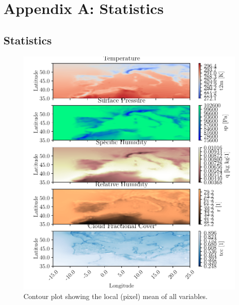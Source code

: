 \appendix
\chapter{Appendix A: Statistics}
\section{Statistics}
\begin{figure}[ht]
    \centering
    \includegraphics{python_figs/contourplot_all_variables_mean.pdf}
    \caption{Contour plot showing the local (pixel) mean of all variables.}
    \label{fig:contour_mean_all_vars}
\end{figure}


